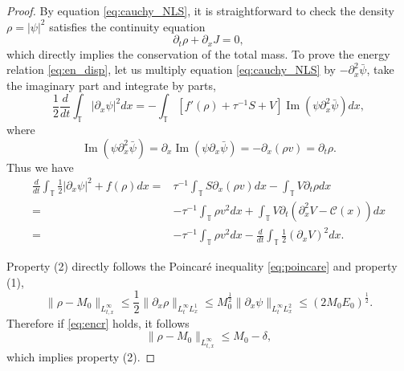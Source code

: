\documentclass[leqno]{amsart}
\theoremstyle{plain}
\theoremstyle{definition}
\theoremstyle{remark}
\theoremstyle{plain}
\theoremstyle{plain}
\def\T{{\mathbb T}}%
\def\d{{\partial}}
\DeclareMathOperator{\IM}{Im}
\numberwithin{equation}{section}
\begin{document}
\begin{proof}
By equation \eqref{eq:cauchy_NLS}, it is straightforward to check the density $\rho=|\psi|^2$ satisfies the continuity equation
\[
\d_t\rho+\d_xJ=0,
\]
which directly implies the conservation of the total mass. To prove the energy relation \eqref{eq:en_disp}, let us multiply equation \eqref{eq:cauchy_NLS} by $-\d_x^2\bar\psi$, take the imaginary part and integrate by parts, 
\[
\frac12\frac{d}{dt}\int_\T|\d_x\psi|^2dx=-\int_\T[f'(\rho)+\tau^{-1}S+V]\IM(\psi\d_x^2\bar\psi)dx,
\]
where
\[
\IM(\psi\d_x^2\bar\psi)=\d_x\IM(\psi\d_x\bar\psi)=-\d_x(\rho v)=\d_t\rho.
\]
Thus we have
\begin{align*}
\frac{d}{dt}\int_\T\frac12|\d_x\psi|^2+f(\rho)dx=&\tau^{-1}\int_\T S\d_x(\rho v) dx-\int_\T V\d_t\rho dx\\
=&-\tau^{-1}\int_\T\rho v^2 dx+\int_\T V\d_t(\d_x^2 V-\mathcal{C}(x))dx\\
=&-\tau^{-1}\int_\T\rho v^2 dx-\frac{d}{dt}\int_\T\frac12(\d_xV)^2dx.
\end{align*}

Property (2) directly follows the Poincar\'e inequality \eqref{eq:poincare} and property (1),
\[
\|\rho-M_0\|_{L^\infty_{t,x}}\leq \frac12\|\d_x\rho\|_{L^\infty_tL^1_x}\leq M_0^\frac12\|\d_x\psi\|_{L^\infty_tL^2_x}\leq (2M_0E_0)^\frac12.
\]
Therefore if \eqref{eq:encr} holds, it follows
\[
\|\rho-M_0\|_{L^\infty_{t,x}}\leq M_0-\delta,
\]
which implies property (2).


\end{proof}
\end{document}
